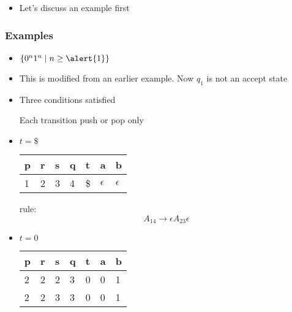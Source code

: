 \begin{frame}[allowframebreaks]
\begin{itemize}
\item Let's discuss an example first

\end{itemize}\end{frame} \begin{frame}[allowframebreaks] \frametitle{Examples}
  \begin{itemize}
\item $\{0^n1^n\mid n \geq \alert{1}\}$
\item This is modified from an earlier example. Now $q_1$ is not an accept state

\begin{center}
\end{center}
  
\item Three conditions satisfied

Each transition push or pop only
\item $t=\$$

  \begin{center}
  \begin{tabular}{lllllll}
p & r & s & q & t & a & b\\ \hline
1 & 2 & 3 & 4 & \$ & $\epsilon$ & $\epsilon$
  \end{tabular}
\end{center}
rule:
\begin{equation*}
A_{14} \rightarrow \epsilon A_{23}\epsilon
\end{equation*}
\item $t = 0$

  \begin{center}
  \begin{tabular}{lllllll}
p & r & s & q & t & a & b\\ \hline
2 & 2 & 2 & 3 & 0 & 0 & 1\\
2 & 2 & 3 & 3 & 0 & 0 & 1\\
  \end{tabular}
\end{center}


\end{itemize}
\end{frame}
